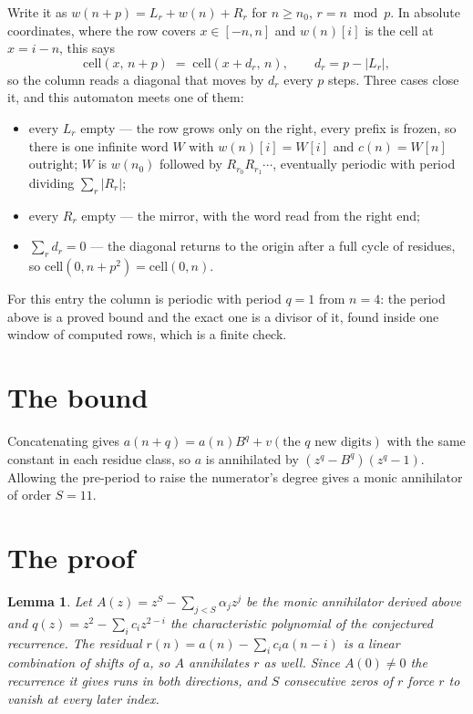\documentclass[11pt,a4paper]{article}
\theoremstyle{plain}
\newtheorem{lemma}[theorem]{Lemma}
\theoremstyle{definition}
\begin{document}
Write it as $w(n+p)=L_r+w(n)+R_r$ for $n\ge n_0$, $r=n \bmod p$. In absolute coordinates, where
the row covers $x\in[-n,n]$ and $w(n)[i]$ is the cell at $x=i-n$, this says
\[
\mathrm{cell}(x,\,n+p)\;=\;\mathrm{cell}(x+d_r,\,n),\qquad d_r=p-|L_r| ,
\]
so the column reads a diagonal that moves by $d_r$ every $p$ steps. Three cases close it, and
this automaton meets one of them:

\begin{itemize}
\item every $L_r$ empty --- the row grows only on the right, every prefix is frozen, so there
is one infinite word $W$ with $w(n)[i]=W[i]$ and $c(n)=W[n]$ outright; $W$ is $w(n_0)$ followed
by $R_{r_0}R_{r_1}\cdots$, eventually periodic with period dividing $\sum_r|R_r|$;
\item every $R_r$ empty --- the mirror, with the word read from the right end;
\item $\sum_r d_r=0$ --- the diagonal returns to the origin after a full cycle of residues, so
$\mathrm{cell}(0,n+p^2)=\mathrm{cell}(0,n)$.
\end{itemize}

For this entry the column is periodic with period $q=1$ from $n=4$: the period above is a
proved bound and the exact one is a divisor of it, found inside one window of computed rows,
which is a finite check.

\section{The bound}

Concatenating gives $a(n+q)=a(n)B^{q}+v(\text{the }q\text{ new digits})$ with the same constant in each residue class, so $a$ is annihilated by $(z^{q}-B^{q})(z^{q}-1)$.
Allowing the pre-period to raise the numerator's degree gives a monic annihilator of order
$S=11$.

\section{The proof}

\begin{lemma}\label{lem:crit}
Let $A(z)=z^S-\sum_{j<S}\alpha_jz^{j}$ be the monic annihilator derived above and
$q(z)=z^{2}-\sum_ic_iz^{2-i}$ the characteristic polynomial of the conjectured
recurrence. The residual $r(n)=a(n)-\sum_ic_ia(n-i)$ is a linear combination of shifts of $a$,
so $A$ annihilates $r$ as well. Since $A(0)\ne0$ the recurrence it gives runs in both
directions, and $S$ consecutive zeros of $r$ force $r$ to vanish at every later index.
\end{lemma}
\end{document}

